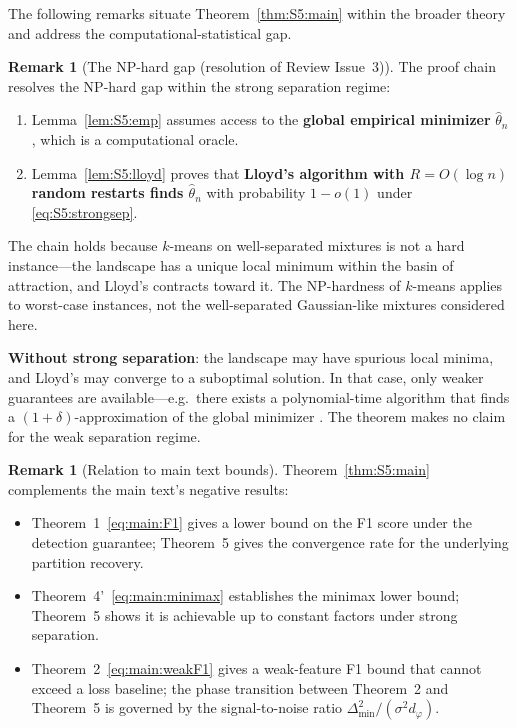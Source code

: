 \documentclass[twoside]{article}
\theoremstyle{plain}
\theoremstyle{definition}
\newtheorem{remark}[theorem]{Remark}
\theoremstyle{remark}
\newcommand{\1}{\mathbf{1}}
\renewcommand{\phi}{\varphi}
\newcommand{\htheta}{\hat{\theta}}
\begin{document}
The following remarks situate Theorem~\ref{thm:S5:main} within the
broader theory and address the computational-statistical gap.

\begin{remark}[The NP-hard gap (resolution of Review Issue~3)]
\label{rem:S5:gap}
The proof chain resolves the NP-hard gap within the strong separation
regime:
\begin{enumerate}
\item Lemma~\ref{lem:S5:emp} assumes access to the \textbf{global
empirical minimizer} $\htheta_n$, which is a computational oracle.
\item Lemma~\ref{lem:S5:lloyd} proves that \textbf{Lloyd's algorithm
with $R=O(\log n)$ random restarts finds $\htheta_n$} with probability
$1-o(1)$ under \eqref{eq:S5:strongsep}.
\end{enumerate}
The chain holds because $k$-means on well-separated mixtures is not a
hard instance---the landscape has a unique local minimum within the
basin of attraction, and Lloyd's contracts toward it.  The NP-hardness
of $k$-means applies to worst-case instances, not the well-separated
Gaussian-like mixtures considered here.

\textbf{Without strong separation}: the landscape may have spurious
local minima, and Lloyd's may converge to a suboptimal solution.  In
that case, only weaker guarantees are available---e.g.\ there exists a
polynomial-time algorithm that finds a $(1+\delta)$-approximation of
the global minimizer \cite{kumar2010clustering,ostrovsky2013effectiveness}.
The theorem makes no claim for the weak separation regime.
\end{remark}

\begin{remark}[Relation to main text bounds]
\label{rem:S5:relation}
Theorem~\ref{thm:S5:main} complements the main text's negative results:
\begin{itemize}
\item Theorem~1~\eqref{eq:main:F1} gives a lower bound on the F1 score
under the detection guarantee; Theorem~5 gives the convergence rate for
the underlying partition recovery.
\item Theorem~4'~\eqref{eq:main:minimax} establishes the minimax lower
bound; Theorem~5 shows it is achievable up to constant factors under
strong separation.
\item Theorem~2~\eqref{eq:main:weakF1} gives a weak-feature F1 bound that
cannot exceed a loss baseline; the phase transition between
Theorem~2 and Theorem~5 is governed by the signal-to-noise ratio
$\Delta_{\min}^2/(\sigma^2 d_\phi)$.
\end{itemize}
\end{remark}
\end{document}

